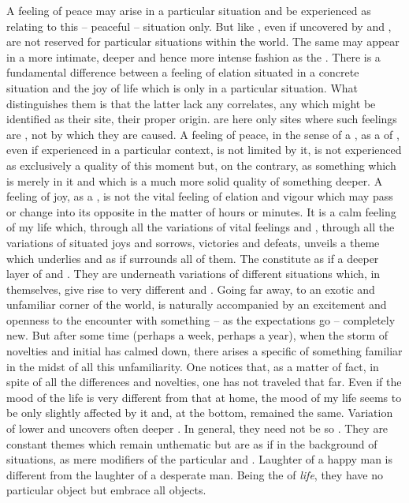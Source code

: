 \pa A feeling of peace may arise in a particular situation and be experienced as
relating to this -- peaceful -- situation only.  But  like
, even if uncovered by  and , are not
reserved for particular situations within the world.  The same 
may appear in a more intimate, deeper and hence more intense fashion as the
. There is a fundamental difference between a feeling of
elation situated in a concrete situation and the joy of life which is only
 in a particular situation.  What distinguishes them is that the
latter lack any  correlates, any  which might be
identified as their site, their proper origin.   are here only
sites where such feelings are , not by which they are caused.  A
feeling of peace, in the sense of a , as a  of
, even if experienced in a particular context, is not limited by
it, is not experienced as exclusively a quality of this moment but, on the
contrary, as something which is merely  in it and which is a much
more solid quality of something deeper.  A feeling of joy, as a , is not the vital feeling of elation and vigour which may pass or change
into its opposite in the matter of hours or minutes. It is a calm feeling of my
life which, through all the variations of vital feelings and , through
all the variations of situated joys and sorrows, victories and defeats, unveils
a theme which underlies and as if surrounds all of them.  The  constitute as if a deeper layer of  and . They
are  underneath variations of different situations which, in
themselves, give rise to very different  and . Going
far away, to an exotic and unfamiliar corner of the world, is naturally
accompanied by an excitement and openness to the encounter with something -- as
the expectations go -- completely new. But after some time (perhaps a week,
perhaps a year), when the storm of novelties and initial  has
calmed down, there arises a specific  of something familiar in the
midst of all this unfamiliarity.  One notices that, as a matter of fact, in
spite of all the differences and novelties, one has not traveled that far. Even
if the mood of the life  is very different from that at home, the
mood of my life seems to be only slightly affected by it and, at the bottom,
remained the same. Variation of lower  and  uncovers
often deeper . In general, they need not be so .  They
are constant themes which remain unthematic but are  as if in
the background of  situations, as mere modifiers of the particular
 and . Laughter of a happy man is different from the
laughter of a desperate man. Being the  of {\em life}, they have no
particular object but embrace all objects.

